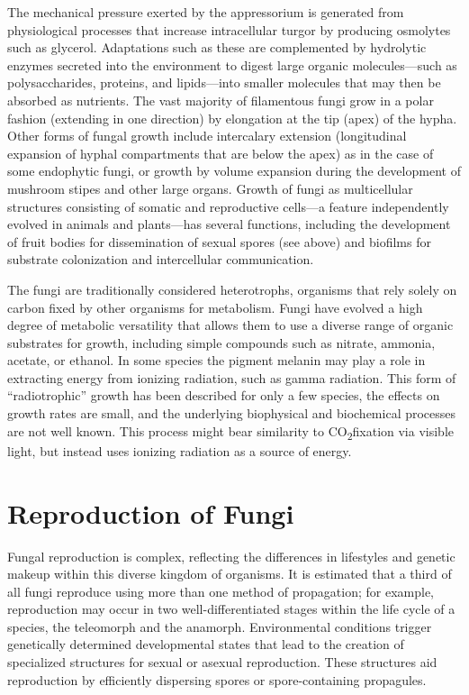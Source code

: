 The mechanical pressure exerted by the appressorium is generated from physiological processes that increase intracellular turgor by producing osmolytes such as glycerol. Adaptations such as these are complemented by hydrolytic enzymes secreted into the environment to digest large organic molecules---such as polysaccharides, proteins, and lipids---into smaller molecules that may then be absorbed as nutrients. The vast majority of filamentous fungi grow in a polar fashion (extending in one direction) by elongation at the tip (apex) of the hypha. Other forms of fungal growth include intercalary extension (longitudinal expansion of hyphal compartments that are below the apex) as in the case of some endophytic fungi, or growth by volume expansion during the development of mushroom stipes and other large organs. Growth of fungi as multicellular structures consisting of somatic and reproductive cells---a feature independently evolved in animals and plants---has several functions, including the development of fruit bodies for dissemination of sexual spores (see above) and biofilms for substrate colonization and intercellular communication.

The fungi are traditionally considered heterotrophs, organisms that rely solely on carbon fixed by other organisms for metabolism. Fungi have evolved a high degree of metabolic versatility that allows them to use a diverse range of organic substrates for growth, including simple compounds such as nitrate, ammonia, acetate, or ethanol. In some species the pigment melanin may play a role in extracting energy from ionizing radiation, such as gamma radiation. This form of ``radiotrophic'' growth has been described for only a few species, the effects on growth rates are small, and the underlying biophysical and biochemical processes are not well known. This process might bear similarity to CO\textsubscript{2}fixation via visible light, but instead uses ionizing radiation as a source of energy.

\hypertarget{reproduction-of-fungi}{%
\section{Reproduction of Fungi}\label{reproduction-of-fungi}}

Fungal reproduction is complex, reflecting the differences in lifestyles and genetic makeup within this diverse kingdom of organisms. It is estimated that a third of all fungi reproduce using more than one method of propagation; for example, reproduction may occur in two well-differentiated stages within the life cycle of a species, the teleomorph and the anamorph. Environmental conditions trigger genetically determined developmental states that lead to the creation of specialized structures for sexual or asexual reproduction. These structures aid reproduction by efficiently dispersing spores or spore-containing propagules.

